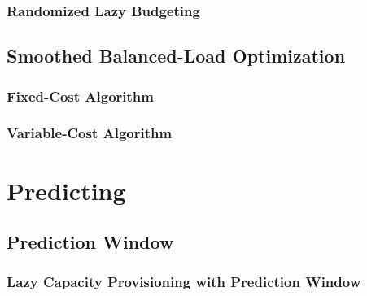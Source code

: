 \subsubsection{Randomized Lazy Budgeting}

\subsection{Smoothed Balanced-Load Optimization}

\subsubsection{Fixed-Cost Algorithm}

\subsubsection{Variable-Cost Algorithm}

\section{Predicting}

\subsection{Prediction Window}

\subsubsection{Lazy Capacity Provisioning with Prediction Window}
